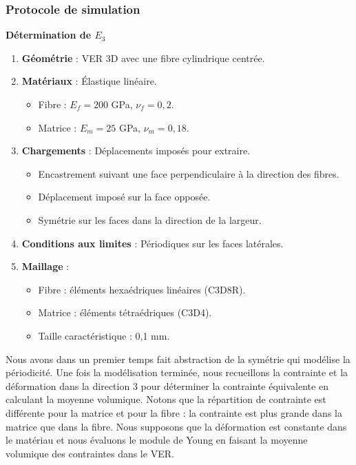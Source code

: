 \documentclass{rapportECL}
\begin{document}
\subsubsection{Protocole de simulation}
\begin{center}
\begin{minipage}{0.9\textwidth}
\begin{framed}
\noindent\textbf{Détermination de $E_3$}
\begin{enumerate}
\item \textbf{Géométrie} : VER 3D avec une fibre cylindrique centrée.
\item \textbf{Matériaux} : Élastique linéaire.
  \begin{itemize}
  \item Fibre : $E_f = 200$ GPa, $\nu_f = 0,2$.
  \item Matrice : $E_m = 25$ GPa, $\nu_m = 0,18$.
  \end{itemize}
\item \textbf{Chargements} : Déplacements imposés pour extraire.
  \begin{itemize}
  \item Encastrement suivant une face perpendiculaire à la direction des fibres.
  \item Déplacement imposé sur la face opposée.
  \item Symétrie sur les faces dans la direction de la largeur.
  \end{itemize}  
\item \textbf{Conditions aux limites} : Périodiques sur les faces latérales.
\item \textbf{Maillage} : 
  \begin{itemize}
  \item Fibre : éléments hexaédriques linéaires (C3D8R).
  \item Matrice : éléments tétraédriques (C3D4).
  \item Taille caractéristique : 0,1 mm.
  \end{itemize}
\end{enumerate}
\end{framed}
\end{minipage}
\end{center}

\vspace{20pt}

\begin{framed}
\noindent Nous avons dans un premier temps fait abstraction de la symétrie qui modélise la périodicité. Une fois la modélisation terminée, nous recueillons la contrainte et la déformation dans la direction 3 pour déterminer la contrainte équivalente en calculant la moyenne volumique. Notons que la répartition de contrainte est différente pour la matrice et pour la fibre : la contrainte est plus grande dans la matrice que dans la fibre. Nous supposons que la déformation est constante dans le matériau et nous évaluons le module de Young en faisant la moyenne volumique des contraintes dans le VER.
\end{framed}
\end{document}
